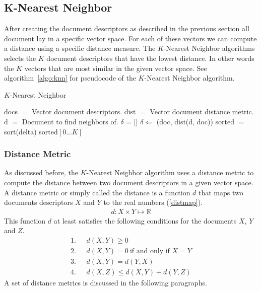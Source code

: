 \subsection{K-Nearest Neighbor}
After creating the document descriptors as described in the previous section
all document lay in a specific vector space. For each of these vectors we
can compute a distance using a specific distance measure. The $K$-Nearest
Neighbor algorithms selects the $K$ document descriptors that have the lowest
distance. In other words the $K$ vectors that are most similar in the given
vector space. See algorithm~\ref{algo:knn} for pseudocode of the $K$-Nearest
Neighbor algorithm.

\begin{algorithm}                      
  \caption{$K$-Nearest Neighbor}      
  \label{algo:knn}
  \begin{algorithmic}

    \STATE docs $=$ Vector document descriptors.
    \STATE dist $=$ Vector document distance metric.
    \STATE d $=$ Document to find neighbors of.
    \STATE $\delta$ = []
      \STATE $\delta \Leftarrow$ (doc, dist(d, doc))
    \ENDFOR
    \STATE sorted $=$ sort(delta)
    \RETURN sorted$[0\ldots K]$
  \end{algorithmic}
\end{algorithm}

\subsubsection{Distance Metric}
\label{sec:metrics}
As discussed before, the $K$-Nearest Neighbor algorithm uses a distance metric
to compute the distance between two document descriptors in a given vector
space. A distance metric or simply called the distance is a function $d$ that 
maps two documents descriptors $X$ and $Y$ to the real numbers (\ref{distmap}).
\begin{align}
  d : X \times Y \mapsto \mathbb{R} \label{distmap}
\end{align}
This function $d$ at least satisfies the following conditions for the documents
$X$, $Y$ and $Z$.
\begin{align*}
  1.\ \ \ & d(X,Y) \geq 0 \\
  2.\ \ \ & d(X,Y) = 0\  \text{if and only if $X=Y$} \\
  3.\ \ \ & d(X,Y) = d(Y,X) \\
  4.\ \ \ & d(X,Z) \leq d(X,Y) + d(Y,Z)
\end{align*}
A set of distance metrics is discussed in the following paragraphs. 

